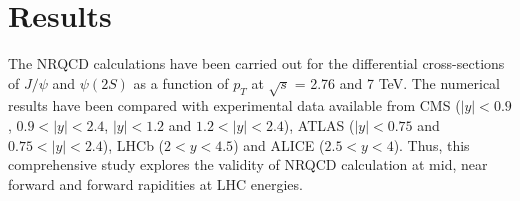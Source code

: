 \documentclass{iopart}
\begin{document}


\section{Results}

The NRQCD calculations have been carried out for the differential cross-sections of $J/\psi$ and $\psi(2S)$ as a function of $p_T$ at $\sqrt{s}$ = 2.76 and 7 TeV. The numerical results have been compared with experimental data available from CMS ($|y|<0.9$, $0.9<|y|<2.4$, $|y|<1.2$ and $1.2<|y|<2.4$), ATLAS ($|y|<0.75$ and $0.75<|y|<2.4$), LHCb ($2<y<4.5$) and ALICE ($2.5<y<4$). Thus, this comprehensive study explores the validity of NRQCD calculation at mid, near forward and forward rapidities at LHC energies.
\end{document}
